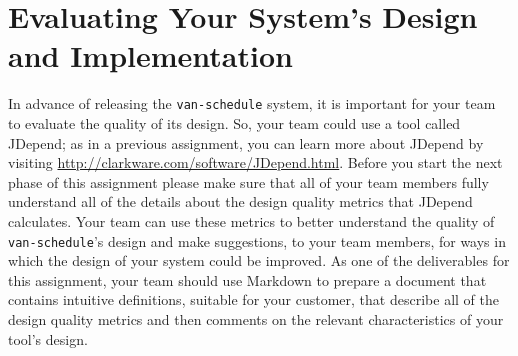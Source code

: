 \vspace*{-.05in}



\section*{Evaluating Your System's Design and Implementation}

In advance of releasing the {\tt van-schedule} system, it is important for your team to evaluate the quality of its
design.  So, your team could use a tool called JDepend; as in a previous assignment, you can learn more about
JDepend by visiting \url{http://clarkware.com/software/JDepend.html}.  Before you start the next phase of this
assignment please make sure that all of your team members fully understand all of the details about the design quality
metrics that JDepend calculates.  Your team can use these metrics to better understand the quality of {\tt
van-schedule}'s design and make suggestions, to your team members, for ways in which the design of your system could be
improved.  As one of the deliverables for this assignment, your team should use Markdown to prepare a document that
contains intuitive definitions, suitable for your customer, that describe all of the design quality metrics and then
comments on the relevant characteristics of your tool's design.

